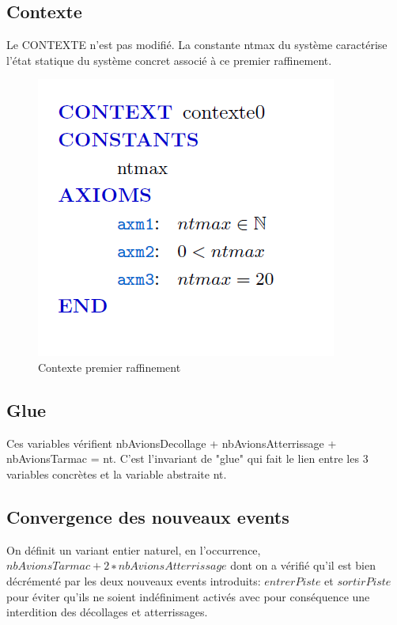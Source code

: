 \subsection{Contexte}
Le CONTEXTE n'est pas modifié. La constante ntmax du système caractérise l'état statique du système concret associé à ce premier raffinement.

\begin{figure}[H]
	\begin{center}	
		\includegraphics[scale=1]{images/1/ctx1}
		\caption{Contexte premier raffinement}
		\label{ctx1}
	\end{center}
\end{figure}

\subsection{Glue}Ces variables vérifient nbAvionsDecollage + nbAvionsAtterrissage + nbAvionsTarmac = nt. C'est l'invariant de "glue" qui fait le lien entre les 3 variables concrètes et la variable abstraite nt.

\subsection{Convergence des nouveaux events}

On définit un variant entier naturel, en l'occurrence, $nbAvionsTarmac + 2 ∗ nbAvionsAtterrissage$ dont on a vérifié qu'il est bien décrémenté par les deux nouveaux events introduits: $entrerPiste$ et $sortirPiste$ pour éviter qu'ils ne soient indéfiniment activés avec pour conséquence une interdition des décollages et atterrissages.

